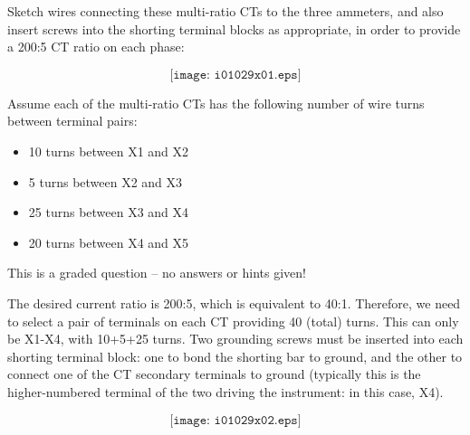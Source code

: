 

Sketch wires connecting these multi-ratio CTs to the three ammeters, and also insert screws into the shorting terminal blocks as appropriate, in order to provide a 200:5 CT ratio on each phase:

$$\texttt{[image: i01029x01.eps]}$$

Assume each of the multi-ratio CTs has the following number of wire turns between terminal pairs:

\begin{itemize}
\item{} 10 turns between X1 and X2
\item{} 5 turns between X2 and X3
\item{} 25 turns between X3 and X4
\item{} 20 turns between X4 and X5
\end{itemize}


\vfil 

\eject






This is a graded question -- no answers or hints given!
 






The desired current ratio is 200:5, which is equivalent to 40:1.  Therefore, we need to select a pair of terminals on each CT providing 40 (total) turns.  This can only be X1-X4, with 10+5+25 turns.  Two grounding screws must be inserted into each shorting terminal block: one to bond the shorting bar to ground, and the other to connect one of the CT secondary terminals to ground (typically this is the higher-numbered terminal of the two driving the instrument: in this case, X4).

$$\texttt{[image: i01029x02.eps]}$$




